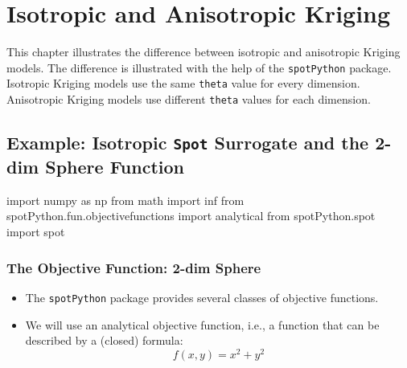 \documentclass[
  letterpaper,
  DIV=11,
  numbers=noendperiod]{scrreprt}
\newenvironment{Shaded}{\begin{snugshade}}{\end{snugshade}}
\newcommand{\ImportTok}[1]{\textcolor[rgb]{0.00,0.46,0.62}{#1}}
\newcommand{\NormalTok}[1]{\textcolor[rgb]{0.00,0.23,0.31}{#1}}
\providecommand{\tightlist}{%
  \setlength{\itemsep}{0pt}\setlength{\parskip}{0pt}}\usepackage{longtable,booktabs,array}
\begin{document}
\hypertarget{sec-iso-aniso-kriging}{%
\chapter{Isotropic and Anisotropic
Kriging}\label{sec-iso-aniso-kriging}}

This chapter illustrates the difference between isotropic and
anisotropic Kriging models. The difference is illustrated with the help
of the \texttt{spotPython} package. Isotropic Kriging models use the
same \texttt{theta} value for every dimension. Anisotropic Kriging
models use different \texttt{theta} values for each dimension.

\hypertarget{example-isotropic-spot-surrogate-and-the-2-dim-sphere-function}{%
\section{\texorpdfstring{Example: Isotropic \texttt{Spot} Surrogate and
the 2-dim Sphere
Function}{Example: Isotropic Spot Surrogate and the 2-dim Sphere Function}}\label{example-isotropic-spot-surrogate-and-the-2-dim-sphere-function}}

\begin{Shaded}
\begin{Highlighting}[]
\ImportTok{import}\NormalTok{ numpy }\ImportTok{as}\NormalTok{ np}
\ImportTok{from}\NormalTok{ math }\ImportTok{import}\NormalTok{ inf}
\ImportTok{from}\NormalTok{ spotPython.fun.objectivefunctions }\ImportTok{import}\NormalTok{ analytical}
\ImportTok{from}\NormalTok{ spotPython.spot }\ImportTok{import}\NormalTok{ spot}
\end{Highlighting}
\end{Shaded}

\hypertarget{the-objective-function-2-dim-sphere}{%
\subsection{The Objective Function: 2-dim
Sphere}\label{the-objective-function-2-dim-sphere}}

\begin{itemize}
\tightlist
\item
  The \texttt{spotPython} package provides several classes of objective
  functions.
\item
  We will use an analytical objective function, i.e., a function that
  can be described by a (closed) formula: \[f(x, y) = x^2 + y^2\]
\end{itemize}
\end{document}
